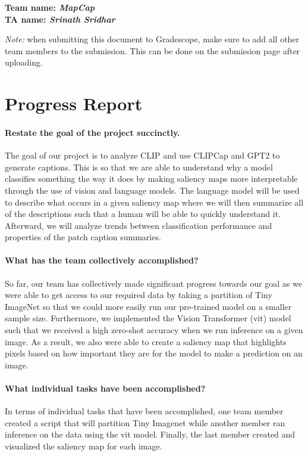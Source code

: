 \textbf{Team name: \emph{MapCap}}\\
\textbf{TA name: \emph{Srinath Sridhar}}

\emph{Note:} when submitting this document to Gradescope, make sure to add all other team members to the submission. This can be done on the submission page after uploading.

\section*{Progress Report}

\paragraph{Restate the goal of the project succinctly.}
The goal of our project is to analyze CLIP and use CLIPCap and GPT2 to generate captions. This is so that we are able to understand why a model classifies something the way it does by making saliency maps more interpretable through the use of vision and language models. The language model will be used to describe what occurs in a given saliency map where we will then summarize all of the descriptions such that a human will be able to quickly understand it. Afterward, we will analyze trends between classification performance and properties of the patch caption summaries. 

\paragraph{What has the team collectively accomplished?}
So far, our team has collectively made significant progress towards our goal as we were able to 
get access to our required data by taking a partition of Tiny ImageNet so that we could more easily run our pre-trained model on a smaller sample size. Furthermore, we implemented the Vision Transformer (vit) model such that we received a high zero-shot accuracy when we run inference on a given image. As a result, we also were able to create a saliency map that highlights pixels based on how important they are for the model to make a prediction on an image.


\paragraph{What individual tasks have been accomplished?}
In terms of individual tasks that have been accomplished, one team member created a script that will partition Tiny Imagenet while another member ran inference on the data using the vit model. Finally, the last member created and visualized the saliency map for each image. 

